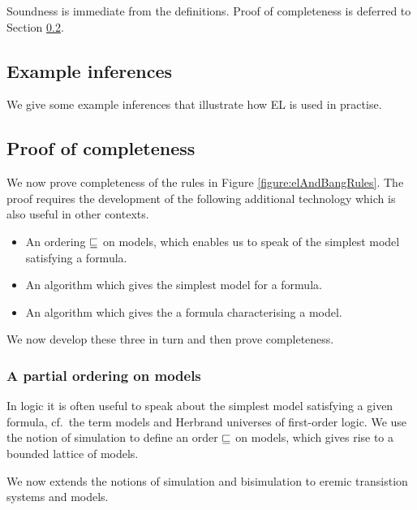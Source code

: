 \NI Soundness is immediate from the definitions. Proof of completeness is
deferred to Section \ref{completenessProof}. 

\subsection{Example inferences}

We give some example inferences that illustrate how EL is used in
practise.

\subsection{Proof of completeness}\label{completenessProof}

\NI We now prove completeness of the rules in Figure
\ref{figure:elAndBangRules}.  The proof requires the development of
the following additional technology which is also useful in other
contexts.

\begin{itemize}

\item An ordering $\sqsubseteq$ on models, which enables us to speak of the
  simplest model satisfying a formula.

\item An algorithm which gives the simplest model for a formula.

\item An algorithm which gives the a formula characterising a model.

\end{itemize}

\NI We now develop these three in turn and then prove completeness.

\subsubsection{A partial ordering on models}

\NI In logic it is often useful to speak about the simplest model
satisfying a given formula, cf.~the term models and Herbrand universes
of first-order logic. We use the notion of
simulation to define an order $\sqsubseteq$ on models, which gives rise to a
bounded lattice of models.

We now extends the notions of simulation and bisimulation to eremic
transistion systems and models.

